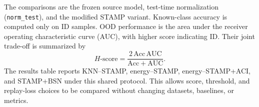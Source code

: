 The comparisons are the frozen source model, test-time normalization
(\texttt{norm\_test}), and the modified STAMP variant. Known-class accuracy is
computed only on ID samples. OOD performance is the area under the receiver
operating characteristic curve (AUC), with higher score indicating ID. Their
joint trade-off is summarized by
\begin{equation}
    H\text{-score}=\frac{2\,\mathrm{Acc}\,\mathrm{AUC}}
    {\mathrm{Acc}+\mathrm{AUC}}.
\end{equation}
The results table reports KNN--STAMP, energy--STAMP, energy--STAMP+ACI, and
STAMP+BSN under this shared protocol. This allows score, threshold, and
replay-loss choices to be compared without changing datasets, baselines, or
metrics.
